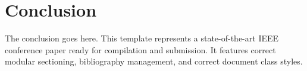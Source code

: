 \section{Conclusion}
The conclusion goes here. 
This template represents a state-of-the-art IEEE conference paper ready for compilation and submission. It features correct modular sectioning, bibliography management, and correct document class styles. 
